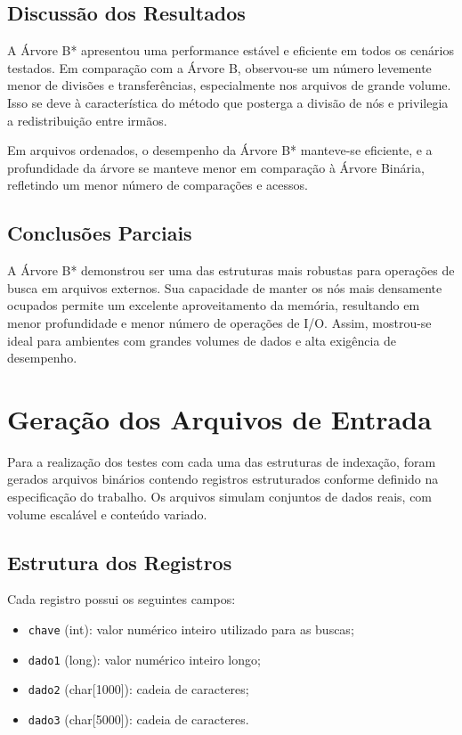 \documentclass[12pt,a4paper,brazil]{article}
\begin{document}
\subsection{Discussão dos Resultados}

A Árvore B* apresentou uma performance estável e eficiente em todos os cenários testados. Em comparação com a Árvore B, observou-se um número levemente menor de divisões e transferências, especialmente nos arquivos de grande volume. Isso se deve à característica do método que posterga a divisão de nós e privilegia a redistribuição entre irmãos.

Em arquivos ordenados, o desempenho da Árvore B* manteve-se eficiente, e a profundidade da árvore se manteve menor em comparação à Árvore Binária, refletindo um menor número de comparações e acessos.

\subsection{Conclusões Parciais}

A Árvore B* demonstrou ser uma das estruturas mais robustas para operações de busca em arquivos externos. Sua capacidade de manter os nós mais densamente ocupados permite um excelente aproveitamento da memória, resultando em menor profundidade e menor número de operações de I/O. Assim, mostrou-se ideal para ambientes com grandes volumes de dados e alta exigência de desempenho.

\section{Geração dos Arquivos de Entrada}

Para a realização dos testes com cada uma das estruturas de indexação, foram gerados arquivos binários contendo registros estruturados conforme definido na especificação do trabalho. Os arquivos simulam conjuntos de dados reais, com volume escalável e conteúdo variado.

\subsection{Estrutura dos Registros}

Cada registro possui os seguintes campos:

\begin{itemize}
  \item \texttt{chave} (int): valor numérico inteiro utilizado para as buscas;
  \item \texttt{dado1} (long): valor numérico inteiro longo;
  \item \texttt{dado2} (char[1000]): cadeia de caracteres;
  \item \texttt{dado3} (char[5000]): cadeia de caracteres.
\end{itemize}
\end{document}
